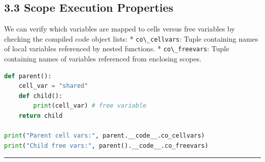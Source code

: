 \hypertarget{scope-execution-properties}{%
\subsection{3.3 Scope Execution
Properties}\label{scope-execution-properties}}

We can verify which variables are mapped to cells versus free variables
by checking the compiled code object lists: *
\passthrough{\lstinline!co\_cellvars!}: Tuple containing names of local
variables referenced by nested functions. *
\passthrough{\lstinline!co\_freevars!}: Tuple containing names of
variables referenced from enclosing scopes.

\begin{lstlisting}[language=Python]
def parent():
    cell_var = "shared"
    def child():
        print(cell_var) # free variable
    return child

print("Parent cell vars:", parent.__code__.co_cellvars)
print("Child free vars:", parent().__code__.co_freevars)
\end{lstlisting}

\begin{center}\rule{0.5\linewidth}{0.5pt}\end{center}
